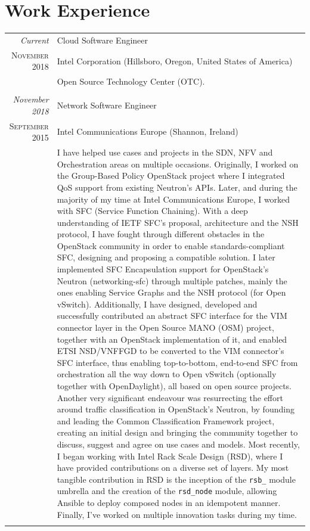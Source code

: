 \documentclass[letter,10pt]{article} %
\begin{document}
\section{Work Experience}
\label{section:work_experience}
\begin{tabular}{r|p{13.4cm}}
	\emph{Current} & Cloud Software Engineer \\
	\textsc{November 2018} & Intel Corporation (Hillsboro, Oregon, United States of America) \\
	& \footnotesize{Open Source Technology Center (OTC).}\\
	\multicolumn{2}{c}{} \\

	\emph{November 2018} & Network Software Engineer \\
	\textsc{September 2015} & Intel Communications Europe (Shannon, Ireland) \\
	& \footnotesize{I have helped use cases and projects in the SDN, NFV and Orchestration areas on multiple occasions. Originally, I worked on the Group-Based Policy OpenStack project where I integrated QoS support from existing Neutron's APIs. Later, and during the majority of my time at Intel Communications Europe, I worked with SFC (Service Function Chaining). With a deep understanding of IETF SFC's proposal, architecture and the NSH protocol, I have fought through different obstacles in the OpenStack community in order to enable standards-compliant SFC, designing and proposing a compatible solution. I later implemented SFC Encapsulation support for OpenStack's Neutron (networking-sfc) through multiple patches, mainly the ones enabling Service Graphs and the NSH protocol (for Open vSwitch). Additionally, I have designed, developed and successfully contributed an abstract SFC interface for the VIM connector layer in the Open Source MANO (OSM) project, together with an OpenStack implementation of it, and enabled ETSI NSD/VNFFGD to be converted to the VIM connector's SFC interface, thus enabling top-to-bottom, end-to-end SFC from orchestration all the way down to Open vSwitch (optionally together with OpenDaylight), all based on open source projects. Another very significant endeavour was resurrecting the effort around traffic classification in OpenStack's Neutron, by founding and leading the Common Classification Framework project, creating an initial design and bringing the community together to discuss, suggest and agree on use cases and models. Most recently, I began working with Intel Rack Scale Design (RSD), where I have provided contributions on a diverse set of layers. My most tangible contribution in RSD is the inception of the \verb+rsb_+ module umbrella and the creation of the \verb+rsd_node+ module, allowing Ansible to deploy composed nodes in an idempotent manner. Finally, I've worked on multiple innovation tasks during my time.}\\
	\multicolumn{2}{c}{} \\


\end{tabular}
\end{document}
